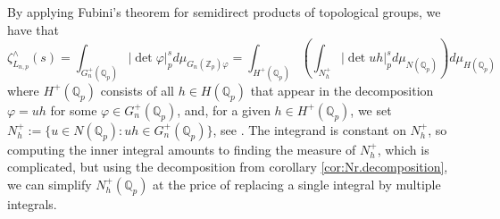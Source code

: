\documentclass[12pt]{article}
\begin{document}
By applying Fubini's theorem for semidirect products of topological groups, we have that \[\zeta_{L_{n,p}}^{\wedge}(s)=\displaystyle\int_{G_{n}^{+}(\mathbb{Q}_p)}|\det{\varphi}|_p^sd\mu_{G_{n}(\mathbb{Z}_p)\varphi}=\displaystyle\int_{H^+(\mathbb{Q}_p)}\left(\displaystyle\int_{N_{h}^+}|\det{uh}|_p^sd\mu_{N(\mathbb{Q}_p)}\right)d\mu_{H(\mathbb{Q}_p)}\]
where $H^+(\mathbb{Q}_p)$ consists of all $h\in{H(\mathbb{Q}_{p})}$ that appear in the decomposition $\varphi=uh$ for some $\varphi\in{G_{n}^{+}(\mathbb{Q}_{p})}$, and, for a given $h\in{H^{+}(\mathbb{Q}_{p})}$, we set $N_{h}^{+}:=\{u\in{N(\mathbb{Q}_{p}) : uh\in{G_{n}^{+}(\mathbb{Q}_{p})}}\}$, see \cite{BermanGlazerSchein}. The integrand is constant on $N_{h}^{+}$, so computing the inner integral amounts to finding the measure of $N_{h}^+$, which is complicated, but using the decomposition from corollary \ref{cor:Nr.decomposition}, we can simplify $N_{h}^{+}(\mathbb{Q}_{p})$ at the price of replacing a single integral by multiple integrals.
\end{document}
